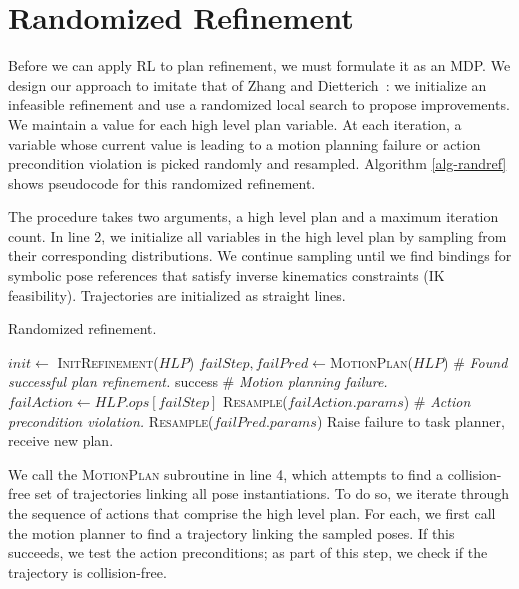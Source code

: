 \section{Randomized Refinement}
Before we can apply RL to plan refinement, we must formulate it as an MDP.
We design our approach to imitate that of Zhang and Dietterich~\cite{JobShopSched}:
we initialize an infeasible refinement and use a randomized local search to propose
improvements. We maintain a value for each high level plan
variable. At each iteration, a variable whose current value is leading to a motion planning failure or
action precondition violation is picked randomly and resampled.
Algorithm \ref{alg-randref} shows pseudocode for this randomized refinement.

The procedure takes two arguments, a high level plan and a maximum
iteration count. In line 2, we initialize all variables in the high level plan by sampling
from their corresponding distributions. We continue sampling
until we find bindings for symbolic pose references that satisfy
inverse kinematics constraints (IK feasibility). Trajectories are
initialized as straight lines.

\begin{algorithm}[t]
 \caption{Randomized refinement.} \label{alg-randref}
 \begin{algorithmic}[1]
  \State $init \leftarrow$ \textsc{InitRefinement}($HLP$)
  \State $failStep, failPred \leftarrow $\textsc{MotionPlan}($HLP$)
  \State \# \emph{Found successful plan refinement.}
  \State \Return success
  \EndIf
  \State \# \emph{Motion planning failure.}
  \State $failAction \leftarrow HLP.ops[failStep]$
  \State \textsc{Resample}($failAction.params$)
  \Else
  \State \# \emph{Action precondition violation.}
  \State \textsc{Resample}($failPred.params$)
  \EndIf
  \EndFor
  \State Raise failure to task planner, receive new plan.
  \EndProcedure
 \end{algorithmic}
\end{algorithm}

We call the \textsc{MotionPlan} subroutine in line 4, which attempts to
find a collision-free set of trajectories linking all pose instantiations.
To do so, we iterate through the sequence of actions that comprise the high level plan.
For each, we first call the motion planner to find a trajectory
linking the sampled poses. If this succeeds, we test the action preconditions;
as part of this step, we check if the trajectory is collision-free.

